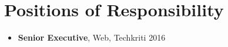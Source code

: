\section*{\sc Positions of Responsibility}
\vspace{-2mm}
\hrulefill
\vspace{.2cm}

\begin{itemize}
\item \textbf{Senior Executive}, Web, Techkriti 2016
\end{itemize}
